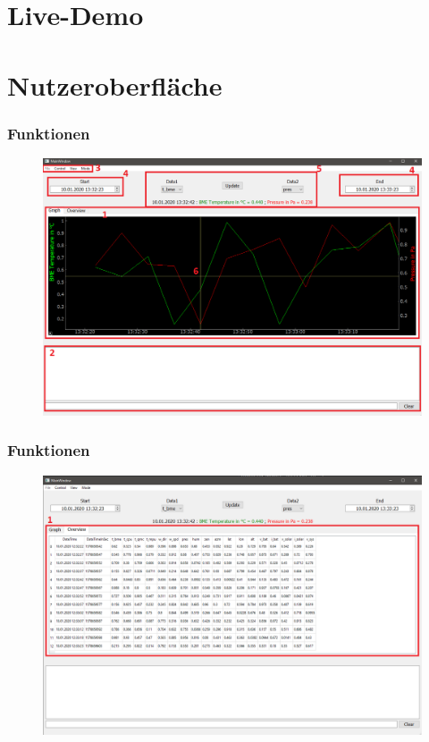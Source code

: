 \documentclass{beamer}
\begin{document}
\section{Live-Demo}

\section{Nutzeroberfläche}

\begin{frame}
  \frametitle{Funktionen}
  \begin{figure}[H]
    \centering
    \includegraphics[width=\textwidth]{./img/ui_simulated_graph}
  \end{figure}
\end{frame}
\begin{frame}
  \frametitle{Funktionen}
  \begin{figure}[H]
  \centering
  \includegraphics[width=\textwidth]{./img/ui_simulated_table}
\end{figure}
\end{frame}
\end{document}
